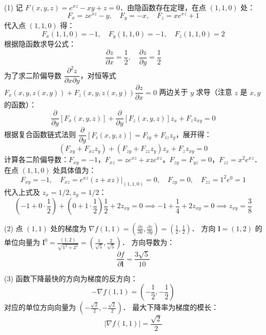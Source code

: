 \documentclass[12pt, a4paper, oneside, UTF8]{ctexbook}
\begin{document}
\begin{solution}
    (1) 记 $F(x,y,z) = e^{xz} - xy + z = 0$．由隐函数存在定理，在点 $(1,1,0)$ 处：
    \[ F_x = ze^{xz} - y,\quad F_y = -x,\quad F_z = xe^{xz} + 1 \]
    代入点 $(1,1,0)$ 得：
    \[ F_x(1,1,0) = -1,\quad F_y(1,1,0) = -1,\quad F_z(1,1,0) = 2 \]
    根据隐函数求导公式：
    \[ \boxed{\frac{\partial z}{\partial x} = \frac{1}{2}},\quad \frac{\partial z}{\partial y} = \frac{1}{2} \]
    为了求二阶偏导数 $\dfrac{\partial^2 z}{\partial x \partial y}$，对恒等式 $F_x(x,y,z(x,y)) + F_z(x,y,z(x,y)) \dfrac{\partial z}{\partial x} = 0$ 两边关于 $y$ 求导（注意 $z$ 是 $x,y$ 的函数）：
    \[ \frac{\partial}{\partial y}[F_x(x,y,z)] + \frac{\partial}{\partial y}[F_z(x,y,z)] z_x + F_z z_{xy} = 0 \]
    根据复合函数链式法则 $\dfrac{\partial}{\partial y}[F_i(x,y,z)] = F_{iy} + F_{iz}z_y$，展开得：
    \[ (F_{xy} + F_{xz}z_y) + (F_{zy} + F_{zz}z_y)z_x + F_z z_{xy} = 0 \]
    计算各二阶偏导数：$F_{xy} = -1$，$F_{xz} = ze^{xz} + xze^{xz}$，$F_{zy} = F_{yz} = 0$，$F_{zz} = x^2 e^{xz}$．
    在点 $(1,1,0)$ 处具体值为：
    \[ F_{xy} = -1, \quad F_{xz} = e^{xz}(z+xz) \big|_{(1,1,0)} = 0, \quad F_{zy} = 0, \quad F_{zz} = 1^2 e^{0} = 1 \]
    代入上式及 $z_x = 1/2, z_y = 1/2$：
    \[ (-1 + 0 \cdot \frac{1}{2}) + (0 + 1 \cdot \frac{1}{2})\frac{1}{2} + 2 z_{xy} = 0 \implies -1 + \frac{1}{4} + 2 z_{xy} = 0 \implies \boxed{z_{xy} = \frac{3}{8}} \]

    (2) 点 $(1,1)$ 处的梯度为 $\nabla f(1,1) = \left( \frac{\partial z}{\partial x}, \frac{\partial z}{\partial y} \right) = \left( \frac{1}{2}, \frac{1}{2} \right)$．
    方向 $\bm{l} = (1, 2)$ 的单位向量为 $\bm{l}^0 = \frac{(1,2)}{\sqrt{1^2+2^2}} = \left( \frac{1}{\sqrt{5}}, \frac{2}{\sqrt{5}} \right)$．
    方向导数为：
    \[ \boxed{\frac{\partial f}{\partial \bm{l}} = \frac{3\sqrt{5}}{10}} \]

    (3) 函数下降最快的方向为梯度的反方向：
    \[ \boxed{-\nabla f(1,1) = \left( -\frac{1}{2}, -\frac{1}{2} \right)} \]
    对应的单位方向向量为 $\left( -\frac{\sqrt{2}}{2}, -\frac{\sqrt{2}}{2} \right)$．
    最大下降率为梯度的模长：
    \[ \boxed{|\nabla f(1,1)| = \frac{\sqrt{2}}{2}} \]
\end{solution}
\end{document}
